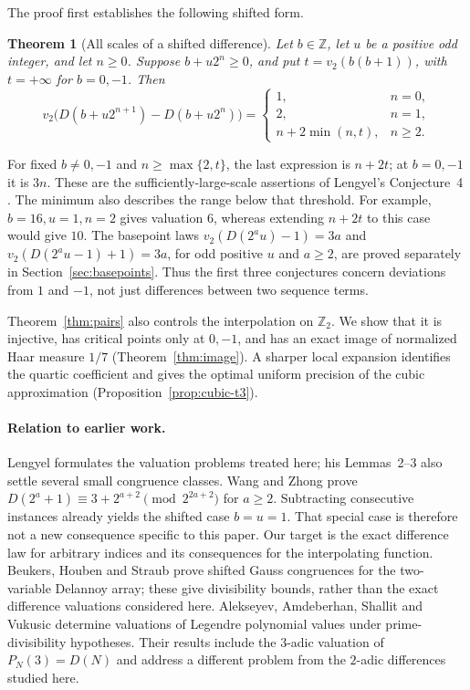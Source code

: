 \documentclass[11pt]{article}
\newtheorem{theorem}{Theorem}
\theoremstyle{remark}\newtheorem{remark}[theorem]{Remark}
\newcommand{\Z}{\mathbb Z}\newcommand{\Q}{\mathbb Q}
\newcommand{\Ztwo}{\mathbb Z_2}\newcommand{\Qtwo}{\mathbb Q_2}
\begin{document}
The proof first establishes the following shifted form.
\begin{theorem}[All scales of a shifted difference]\label{thm:main}
Let $b\in\Z$, let $u$ be a positive odd integer, and let $n\ge0$.
Suppose $b+u2^n\ge0$, and put $t=v_2(b(b+1))$, with
$t=+\infty$ for $b=0,-1$. Then
\[
 v_2\bigl(D(b+u2^{n+1})-D(b+u2^n)\bigr)=
 \begin{cases}
 1,&n=0,\\
 2,&n=1,\\
 n+2\min(n,t),&n\ge2.
 \end{cases}
\]
\end{theorem}
For fixed $b\ne0,-1$ and $n\ge\max\{2,t\}$, the last
expression is $n+2t$; at $b=0,-1$ it is $3n$. These are
the sufficiently-large-scale assertions of Lengyel's
Conjecture~4 \cite[Conjecture~4]{Lengyel2021}. The minimum also
describes the range below that threshold. For example, $b=16,u=1,n=2$
gives valuation $6$, whereas extending $n+2t$ to this case would give
$10$. The basepoint laws $v_2(D(2^a u)-1)=3a$ and
$v_2(D(2^a u-1)+1)=3a$, for odd positive $u$ and $a\ge2$,
are proved separately in Section~\ref{sec:basepoints}. Thus the first
three conjectures concern deviations from $1$ and $-1$, not just
differences between two sequence terms.

Theorem~\ref{thm:pairs} also controls the interpolation on $\Ztwo$.
We show that it is injective, has critical points only at $0,-1$,
and has an exact image of normalized Haar measure $1/7$
(Theorem~\ref{thm:image}). A sharper local expansion identifies
the quartic coefficient and gives the optimal uniform precision of the
cubic approximation (Proposition~\ref{prop:cubic-t3}).

\paragraph{Relation to earlier work.}
Lengyel \cite[Conjectures~1--4]{Lengyel2021} formulates the
valuation problems treated here; his Lemmas~2--3 also settle several
small congruence classes. Wang and Zhong
\cite[Theorem~3.1]{WangZhong2025} prove
$D(2^a+1)\equiv3+2^{a+2}\pmod{2^{2a+2}}$ for $a\ge2$.
Subtracting consecutive instances already yields the shifted case
$b=u=1$. That special case is therefore not a new consequence specific
to this paper. Our target is the exact difference law for arbitrary
indices and its consequences for the interpolating function.
Beukers, Houben and Straub \cite[Example~5.7]{BeukersHoubenStraub2018}
prove shifted Gauss congruences for the two-variable Delannoy array;
these give divisibility bounds, rather than the exact difference
valuations considered here. Alekseyev, Amdeberhan, Shallit and Vukusic
\cite[Theorem~3]{AlekseyevEtAl2025} determine valuations of Legendre
polynomial values under prime-divisibility hypotheses. Their results
include the $3$-adic valuation of $P_N(3)=D(N)$ and address a different
problem from the $2$-adic differences studied here.
\end{document}

